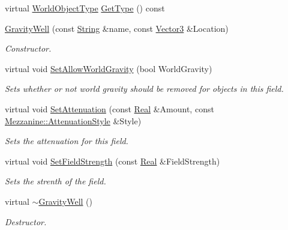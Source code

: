\begin{DoxyCompactItemize}
virtual \hyperlink{namespaceMezzanine_a30335416fc857844e8360c84d1d1b56c}{WorldObjectType} \hyperlink{classMezzanine_1_1GravityWell_aa7c7683357d133831b362c7c923c5271}{GetType} () const 
\item 
\hyperlink{classMezzanine_1_1GravityWell_a4f89751efb62bd71164a2864923dc149}{GravityWell} (const \hyperlink{namespaceMezzanine_acf9fcc130e6ebf08e3d8491aebcf1c86}{String} \&name, const \hyperlink{classMezzanine_1_1Vector3}{Vector3} \&Location)
\begin{DoxyCompactList}\small\item\em Constructor. \item\end{DoxyCompactList}\item 
virtual void \hyperlink{classMezzanine_1_1GravityWell_a80837168a132c3bffcefb839e1669a63}{SetAllowWorldGravity} (bool WorldGravity)
\begin{DoxyCompactList}\small\item\em Sets whether or not world gravity should be removed for objects in this field. \item\end{DoxyCompactList}\item 
virtual void \hyperlink{classMezzanine_1_1GravityWell_ab7668c7c5c1c7c25a40315803efb0790}{SetAttenuation} (const \hyperlink{namespaceMezzanine_a726731b1a7df72bf3583e4a97282c6f6}{Real} \&Amount, const \hyperlink{namespaceMezzanine_a2d10a79e11a2031df10af540eede12fa}{Mezzanine::AttenuationStyle} \&Style)
\begin{DoxyCompactList}\small\item\em Sets the attenuation for this field. \item\end{DoxyCompactList}\item 
virtual void \hyperlink{classMezzanine_1_1GravityWell_a596a662feae83e04e4c299a8aaf8b862}{SetFieldStrength} (const \hyperlink{namespaceMezzanine_a726731b1a7df72bf3583e4a97282c6f6}{Real} \&FieldStrength)
\begin{DoxyCompactList}\small\item\em Sets the strenth of the field. \item\end{DoxyCompactList}\item 
virtual \hyperlink{classMezzanine_1_1GravityWell_affc992ad5e1edafd654d16d6a13840d0}{$\sim$GravityWell} ()
\begin{DoxyCompactList}\small\item\em Destructor. \item\end{DoxyCompactList}\end{DoxyCompactItemize}
